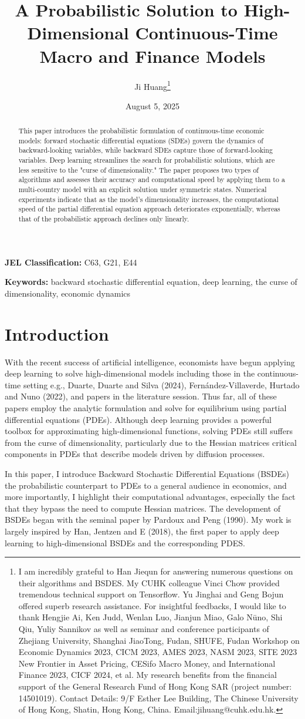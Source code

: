 \documentclass{article}
\title{A Probabilistic Solution to High-Dimensional Continuous-Time Macro and Finance Models}
\author{Ji Huang\thanks{I am incredibly grateful to Han Jiequn for answering numerous questions on their algorithms and BSDES. My CUHK colleague Vinci Chow provided tremendous technical support on Tensorflow. Yu Jinghai and Geng Bojun offered superb research assistance. For insightful feedbacks, I would like to thank Hengjie Ai, Ken Judd, Wenlan Luo, Jianjun Miao, Galo Nūno, Shi Qiu, Yuliy Sannikov as well as seminar and conference participants of Zhejiang University, Shanghai JiaoTong, Fudan, SHUFE, Fudan Workshop on Economic Dynamics 2023, CICM 2023, AMES 2023, NASM 2023, SITE 2023 New Frontier in Asset Pricing, CESifo Macro Money, and International Finance 2023, CICF 2024, et al. My research benefits from the financial support of the General Research Fund of Hong Kong SAR (project number: 14501019). Contact Details: 9/F Esther Lee Building, The Chinese University of Hong Kong, Shatin, Hong Kong, China. Email:jihuang@cuhk.edu.hk.}}
\affil{The Chinese University of Hong Kong}
\date{August 5, 2025}
\begin{document}
\maketitle

\begin{abstract}
This paper introduces the probabilistic formulation of continuous-time economic models: forward stochastic differential equations (SDEs) govern the dynamics of backward-looking variables, while backward SDEs capture those of forward-looking variables. Deep learning streamlines the search for probabilistic solutions, which are less sensitive to the "curse of dimensionality." The paper proposes two types of algorithms and assesses their accuracy and computational speed by applying them to a multi-country model with an explicit solution under symmetric states. Numerical experiments indicate that as the model's dimensionality increases, the computational speed of the partial differential equation approach deteriorates exponentially, whereas that of the probabilistic approach declines only linearly.
\end{abstract}

\noindent \textbf{JEL Classification:} C63, G21, E44

\noindent \textbf{Keywords:} backward stochastic differential equation, deep learning, the curse of dimensionality, economic dynamics

\clearpage

\section*{Introduction}

With the recent success of artificial intelligence, economists have begun applying deep learning to solve high-dimensional models including those in the continuous-time setting e.g., Duarte, Duarte and Silva (2024), Fernández-Villaverde, Hurtado and Nuno (2022), and papers in the literature session. Thus far, all of these papers employ the analytic formulation and solve for equilibrium using partial differential equations (PDEs). Although deep learning provides a powerful toolbox for approximating high-dimensional functions, solving PDEs still suffers from the curse of dimensionality, particularly due to the Hessian matrices critical components in PDEs that describe models driven by diffusion processes.

In this paper, I introduce Backward Stochastic Differential Equations (BSDEs) the probabilistic counterpart to PDEs to a general audience in economics, and more importantly, I highlight their computational advantages, especially the fact that they bypass the need to compute Hessian matrices. The development of BSDEs began with the seminal paper by Pardoux and Peng (1990). My work is largely inspired by Han, Jentzen and E (2018), the first paper to apply deep learning to high-dimensional BSDEs and the corresponding PDES.
\end{document}
